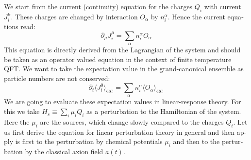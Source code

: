 \documentclass[master,       %
               twoside,        %
               BCOR10mm,       %
               english,ngerman, %
               ]{GAUBM}
\begin{document}
\begin{otherlanguage}{english}
We start from the current (continuity) equation for the charges $Q_i$ with current $J_i^\mu$. These charges are changed by interaction $O_\alpha$ by $n_i^\alpha$. Hence the current equations read:
\begin{equation}
	\label{eq:current_eq}
	\partial_\mu J_i^\mu = \sum_\alpha n_i^\alpha O_\alpha
\end{equation}
This equation is directly derived from the Lagrangian of the system and should be taken as an operator valued equation in the context of finite temperature QFT.
We want to take the expectation value in the grand-canonical ensemble as particle numbers are not conserved:
\begin{equation}
	\label{eq:current_eq_expectation_value}
	\partial_t \langle J_i^0 \rangle_{\mathrm{GC}} = \sum_\alpha n_i^\alpha \langle O_\alpha \rangle_{\mathrm{GC}}
\end{equation}
We are going to evaluate these expectation values in linear-response theory.
For this we take $H_s \equiv \sum_i \mu_i Q_i$ as a perturbation to the Hamiltonian of the system.
Here the $\mu_i$ are the sources, which change slowly compared to the charges $Q_i$.
Let us first derive the equation for linear perturbation theory in general and then apply is first to the perturbation by chemical potentials $\mu_i$ and then to the perturbation by the classical axion field $a(t)$.


\end{otherlanguage}
\end{document}
